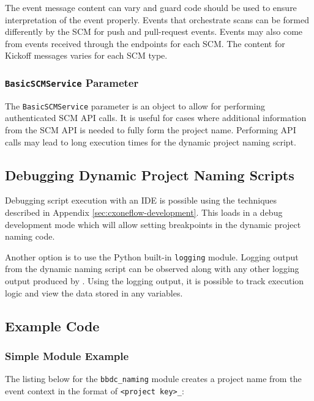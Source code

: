 The event message content can vary and guard code should be used to ensure interpretation of the event properly.
Events that orchestrate scans can be formed differently by the SCM for push and pull-request events.  Events may also
come from events received through the  endpoints for each SCM.  The content for Kickoff
messages varies for each SCM type.

\subsubsection{\texttt{BasicSCMService} Parameter}

The \texttt{BasicSCMService} parameter is an object to allow for performing authenticated SCM API calls.  It is useful for
cases where additional information from the SCM API is needed to fully form the project name.  Performing API calls may
lead to long execution times for the dynamic project naming script.

\subsection{Debugging Dynamic Project Naming Scripts}

Debugging script execution with an IDE is possible using the techniques described in Appendix \ref{sec:cxoneflow-development}.
This loads \cxoneflow in a debug development mode which will allow setting breakpoints in the dynamic project naming code.

Another option is to use the Python built-in \texttt{logging} module.  Logging output from the dynamic naming script can be
observed along with any other logging output produced by \cxoneflowns.  Using the logging output, it is possible to track
execution logic and view the data stored in any variables.

\subsection{Example Code}

\subsubsection{Simple Module Example}

The listing below for the \texttt{bbdc\_naming} module creates a project name from
the event context in the format of \texttt{<project key>\_<repository name>}:

